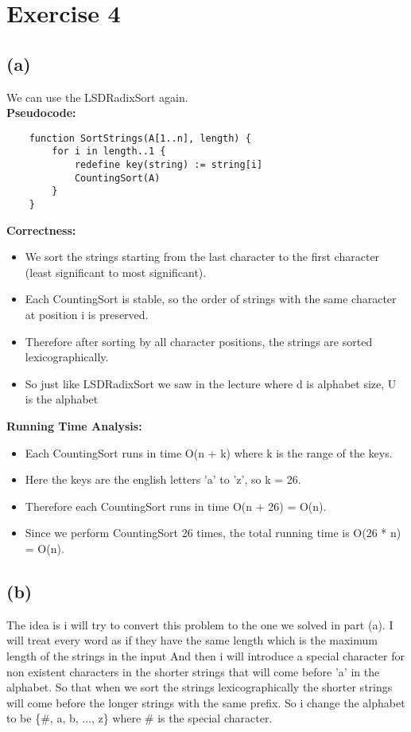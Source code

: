 \documentclass{article}
\begin{document}
\section*{Exercise 4}
\subsection*{(a)}
We can use the LSDRadixSort again. \\
\textbf{Pseudocode:}
\begin{verbatim}
    function SortStrings(A[1..n], length) {
        for i in length..1 {
            redefine key(string) := string[i]
            CountingSort(A)
        }
    }
\end{verbatim}

\textbf{Correctness:}
\begin{itemize}
    \item We sort the strings starting from the last character to the first character (least significant to most significant).
    \item Each CountingSort is stable, so the order of strings with the same character at position i is preserved.
    \item Therefore after sorting by all character positions, the strings are sorted lexicographically.
    \item So just like LSDRadixSort we saw in the lecture where d is alphabet size, U is the alphabet
\end{itemize}

\textbf{Running Time Analysis:}
\begin{itemize}
    \item Each CountingSort runs in time O(n + k) where k is the range of the keys.
    \item Here the keys are the english letters 'a' to 'z', so k = 26.
    \item Therefore each CountingSort runs in time O(n + 26) = O(n).
    \item Since we perform CountingSort 26 times, the total running time is O(26 * n) = O(n).
\end{itemize}

\subsection*{(b)}
The idea is i will try to convert this problem to the one we solved in part (a). I will treat every word as if they have the same length which is the maximum length of the strings in the input
And then i will introduce a special character for non existent characters in the shorter strings that will come before 'a' in the alphabet.
So that when we sort the strings lexicographically the shorter strings will come before the longer strings with the same prefix. So i change the alphabet to be \{\#, a, b, ..., z\} where \# is the special character. \\
\end{document}

